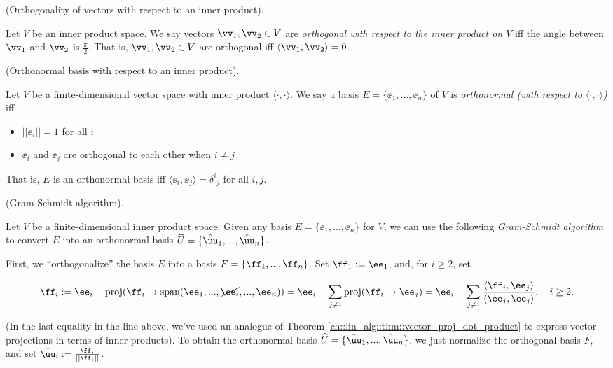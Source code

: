 \begin{defn}
    (Orthogonality of vectors with respect to an inner product). 
    
    Let $V$ be an inner product space. We say vectors $\vv_1, \vv_2 \in V$ are \textit{orthogonal with respect to the inner product on $V$} iff the angle between $\vv_1$ and $\vv_2$ is $\frac{\pi}{2}$. That is, $\vv_1, \vv_2 \in V$ are orthogonal iff $\langle \vv_1, \vv_2 \rangle = 0$.
\end{defn}

\newpage

\begin{defn}
    (Orthonormal basis with respect to an inner product).
    
     Let $V$ be a finite-dimensional vector space with inner product $\langle \cdot, \cdot \rangle$. We say a basis $E = \{\ee_1, ..., \ee_n\}$ of $V$ is \textit{orthonormal (with respect to $\langle \cdot, \cdot \rangle$)} iff
     
     \begin{itemize}
         \item $||\ee_i|| = 1$ for all $i$
         \item $\ee_i$ and $\ee_j$ are orthogonal to each other when $i \neq j$
     \end{itemize}
     
     That is, $E$ is an orthonormal basis iff $\langle \ee_i, \ee_j \rangle = \delta^i{}_j$ for all $i, j$.
\end{defn}

\begin{theorem}
\label{ch::bilinear_forms_metric_tensors::theorem::Gram-Schmidt}
    (Gram-Schmidt algorithm).
    
    Let $V$ be a finite-dimensional inner product space. Given any basis $E = \{\ee_1, ..., \ee_n\}$ for $V$, we can use the following \textit{Gram-Schmidt algorithm} to convert $E$ into an orthonormal basis $\hU = \{\huu_1, ..., \huu_n\}$.
    
    First, we ``orthogonalize'' the basis $E$ into a basis $F = \{\ff_1, ..., \ff_n\}$. Set $\ff_1 := \ee_1$, and, for $i \geq 2$, set
    
    \begin{align*}
        \ff_i := \ee_i - \proj(\ff_i \rightarrow \spann(\ee_1, ..., \cancel{\ee_i}, ..., \ee_n)) = \ee_i - \sum_{j \neq i} \proj(\ff_i \rightarrow \ee_j) = \ee_i - \sum_{j \neq i} \frac{\langle \ff_i, \ee_j \rangle}{\langle \ee_j, \ee_j \rangle}, \quad i \geq 2.
    \end{align*}
    
    (In the last equality in the line above, we've used an analogue of Theorem \ref{ch::lin_alg::thm::vector_proj_dot_product} to express vector projections in terms of inner products). 
    To obtain the orthonormal basis $\hU = \{\huu_1, ..., \huu_n\}$, we just normalize the orthogonal basis $F$, and set $\huu_i := \frac{\ff_i}{||\ff_i||}$.
\end{theorem}

